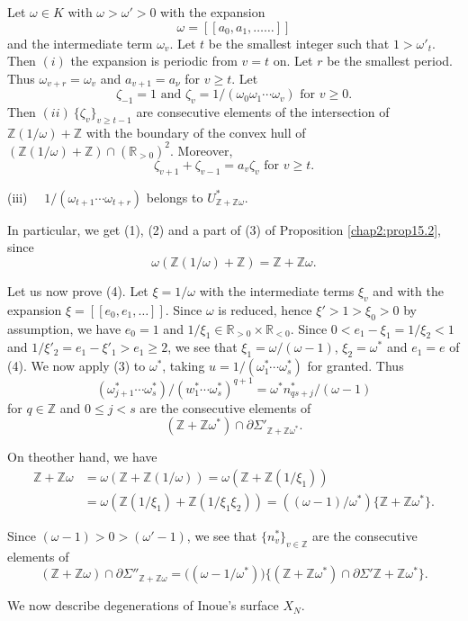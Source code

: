 \begin{lemma}\label{chap2:lem15.6}%
Let $\omega \in K$ with $\omega > \omega ' >0$ with the expansion
$$
\omega =[[a_0,a_1, \ldots \ldots]]
$$ 
and the intermediate term $\omega _v$. Let $t$ be the smallest
integer\pageoriginale 
such that $1> \omega'_t$. Then $(i)$ the expansion is periodic from
$v=t$ on. Let $r$ be the smallest period. Thus $\omega_{v+r}=
\omega_v$ and $a_{v+1}=a_\nu$ for $v \ge t$. Let 
$$
\zeta_{-1}=1 \text{ and }
\zeta_v=1/(\omega_0 \omega_1 \cdots \omega_v) \text{ for } v \ge 0.
$$
Then $(ii) ~ \{\zeta_v \}_{v\ge t-1}$ are consecutive elements of the
intersection of\break $\mathbb{Z}(1/\omega)+\mathbb{Z}$ with the boundary of
the convex hull of $(\mathbb{Z}(1/ \omega)+\mathbb{Z}) \cap
(\mathbb{R}_{>0})^2$. Moreover,  
$$
\zeta_{v+1}+\zeta_{v-1}=a_v \zeta_v \text{ for } v\ge t. 
$$

(iii)~~ $1/(\omega_{t+1} \cdots \omega_{t+r})$ belongs to
$U^*_{\mathbb{Z}+ \mathbb{Z}\omega}$.  

In particular, we get (1), (2) and a part of (3) of Proposition
\ref{chap2:prop15.2}, since 
$$
\omega (\mathbb{Z}(1/ \omega)+\mathbb{Z})= \mathbb{Z}+
\mathbb{Z}\omega. 
$$ 

Let us now prove (4). Let $\xi =1/\omega$ with the intermediate
terms $\xi_v$ and with the expansion $\xi =[[e_0,e_1 ,\ldots]]$. Since
$\omega$ is reduced, hence $\xi' >1> \xi_0>0$ by assumption, we have
$e_0=1$ and $1/ \xi_1 \in \mathbb{R}_{>0} \times \mathbb{R}_{<0}$. Since
$0<e_1-\xi_1= 1/ \xi_2<1$ and $1/ \xi'_2=e_1-\xi'_1>e_1 \ge 2$, we see
that $\xi_1=\omega/(\omega-1)$, $\xi_2 =\omega^*$ and $e_1=e$ of
(4). We now apply (3) to $\omega^*$, taking $u=1/(\omega^*_1
\cdots \omega^*_s)$ for granted. Thus 
$$
(\omega^*_{j+1}\cdots \omega^*_s)/ (w^*_1 \cdots
\omega^*_s)^{q+1}=\omega^* n^*_{qs+j}/(\omega-1) 
$$ 
for $q \in \mathbb{Z}$ and $0\le j< s$ are the consecutive elements of 
$$
(\mathbb{Z}+\mathbb{Z}\omega^*)\cap \partial
\Sigma'_{\mathbb{Z}+\mathbb{Z}\omega^*}. 
$$  

On the\pageoriginale other hand, we have
\begin{align*}
\mathbb{Z}+\mathbb{Z}\omega &=\omega(\mathbb{Z}+ \mathbb{Z}(1/
\omega))=\omega(\mathbb{Z}+\mathbb{Z}(1/ \xi_1))\\ 
&= \omega(\mathbb{Z}(1/ \xi_1)+\mathbb{Z}(1/ \xi_1
\xi_2))=((\omega-1)/ \omega^*)\{\mathbb{Z}+\mathbb{Z}\omega^*\}. 
\end{align*}

Since $(\omega-1)>0>(\omega'-1)$, we see that $\{ n^*_v \}_{v \in
  \mathbb{Z}}$ are the consecutive elements of
$$
(\mathbb{Z}+\mathbb{Z}\omega) \cap \partial
\Sigma''_{\mathbb{Z}+\mathbb{Z}\omega}= \bigg ( (\omega -1 /\omega^*)
\bigg )\{ (\mathbb{Z}+\mathbb{Z}\omega^*) \cap \partial
\Sigma'{\mathbb{Z}+\mathbb{Z} \omega^*} \}. 
$$

We now describe degenerations of Inoue's surface $X_N$.
\end{lemma}

